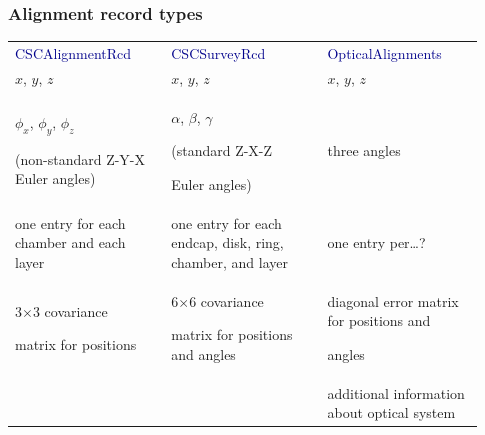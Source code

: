\documentclass[compress]{beamer}
\begin{document}
\begin{frame}
\frametitle{Alignment record types}

\begin{center}\renewcommand{\arraystretch}{1.3}
\begin{tabular}{p{0.31\linewidth} p{0.31\linewidth} p{0.31\linewidth}}
\textcolor{darkblue}{CSCAlignmentRcd} & \textcolor{darkblue}{CSCSurveyRcd} & \textcolor{darkblue}{OpticalAlignments} \\
$x$, $y$, $z$ & $x$, $y$, $z$ & $x$, $y$, $z$ \\
$\phi_x$, $\phi_y$, $\phi_z$

(non-standard Z-Y-X Euler angles) & $\alpha$, $\beta$, $\gamma$

(standard Z-X-Z

Euler angles) & three angles \\
one entry for each chamber and each layer & one entry for each endcap, disk, ring, chamber, and layer & one entry per\ldots? \\
3$\times$3 covariance

matrix for positions & 6$\times$6 covariance

matrix for positions and angles & diagonal error matrix for positions and

angles \\
& & additional information about optical system \\
\end{tabular}
\end{center}








\end{frame}
\end{document}
